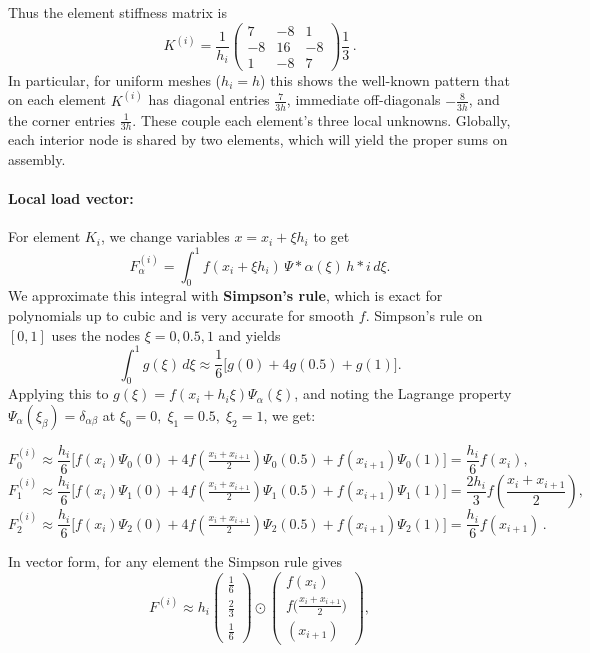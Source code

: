 \documentclass[a4paper,10pt]{article}
\begin{document}
Thus the element stiffness matrix is
$$
	K^{(i)} = \frac{1}{h_i}\begin{pmatrix} 7 & -8 & 1\\ -8 & 16 & -8\\ 1 & -8 & 7\end{pmatrix}\frac{1}{3}\,.
$$
In particular, for uniform meshes ($h_i=h$) this shows the well-known pattern that on each element $K^{(i)}$ has diagonal entries $\frac{7}{3h}$, immediate off-diagonals $-\frac{8}{3h}$, and the corner entries $\frac{1}{3h}$.
These couple each element's three local unknowns.
Globally, each interior node is shared by two elements, which will yield the proper sums on assembly.

\paragraph{Local load vector:} For element $K_i$, we change variables $x = x_i + \xi h_i$ to get
$$
	F^{(i)}_\alpha = \int_{0}^{1} f(x_i + \xi h_i)\,\Psi*\alpha(\xi)\,h*i\,d\xi.
$$
We approximate this integral with \textbf{Simpson's rule}, which is exact for polynomials up to cubic and is very accurate for smooth $f$.
Simpson's rule on $[0,1]$ uses the nodes $\xi=0,0.5,1$ and yields
$$
	\int_{0}^{1} g(\xi)\,d\xi \approx \frac{1}{6}\Big[g(0)+4g(0.5)+g(1)\Big].
$$
Applying this to $g(\xi)=f(x_i+h_i\xi)\Psi_\alpha(\xi)$, and noting the Lagrange property $\Psi_\alpha(\xi_{\beta})=\delta_{\alpha\beta}$ at $\xi_0=0,\;\xi_1=0.5,\;\xi_2=1$, we get:

$$
	F^{(i)}_0 \approx \frac{h_i}{6}\big[f(x_i)\Psi_0(0) + 4f(\tfrac{x_i+x_{i+1}}{2})\Psi_0(0.5)+f(x_{i+1})\Psi_0(1)\big] = \frac{h_i}{6} f(x_i),
$$
$$
	F^{(i)}_1 \approx \frac{h_i}{6}\big[f(x_i)\Psi_1(0) + 4f(\tfrac{x_i+x_{i+1}}{2})\Psi_1(0.5)+f(x_{i+1})\Psi_1(1)\big] = \frac{2h_i}{3} f\!\left(\frac{x_i+x_{i+1}}{2}\right),
$$
$$
	F^{(i)}_2 \approx \frac{h_i}{6}\big[f(x_i)\Psi_2(0) + 4f(\tfrac{x_i+x_{i+1}}{2})\Psi_2(0.5)+f(x_{i+1})\Psi_2(1)\big] = \frac{h_i}{6} f(x_{i+1})\,.
$$

In vector form, for any element the Simpson rule gives
$$
	F^{(i)} \approx h_i
	\begin{pmatrix}
		\frac{1}{6} \\[1ex]\frac{2}{3}\\[1ex]
		\frac{1}{6}
	\end{pmatrix}
	\odot
	\begin{pmatrix}
		f(x_i)                             \\[1ex]
		f\!\big(\frac{x_i+x_{i+1}}{2}\big) \\[1ex]
		(x_{i+1})
	\end{pmatrix},
$$
\end{document}
